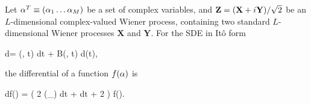 \begin{theorem}
\label{thm:fpe-sde:ito-formula:ito-f-complex}
	Let $\mathbf{\alpha}^T \equiv (\alpha_1 \ldots \alpha_M)$ be a set of complex variables, and $\mathbf{Z} = (\mathbf{X} + i\mathbf{Y}) / \sqrt{2}$ be an $L$-dimensional complex-valued Wiener process, containing two standard $L$-dimensional Wiener processes $\mathbf{X}$ and $\mathbf{Y}$.
	For the SDE in It\^{o} form
	\begin{eqn*}
		d\balpha = \avec(\balpha, t) dt + B(\balpha, t) d\Zvec(t),
	\end{eqn*}
	the differential of a function $f(\mathbf{\alpha})$ is
	\begin{eqn*}
		df(\balpha) = \left(
			2 \Real (\avec \cdot \bpartial_{\balpha}) dt
			+ \Trace{ B B^H \bpartial_{\balpha^*} \bpartial_{\balpha}^T } dt
			+ 2 \Real \Trace{ B d\Zvec \bpartial_{\balpha}^T }
		\right) f(\balpha).
	\end{eqn*}
\end{theorem}
